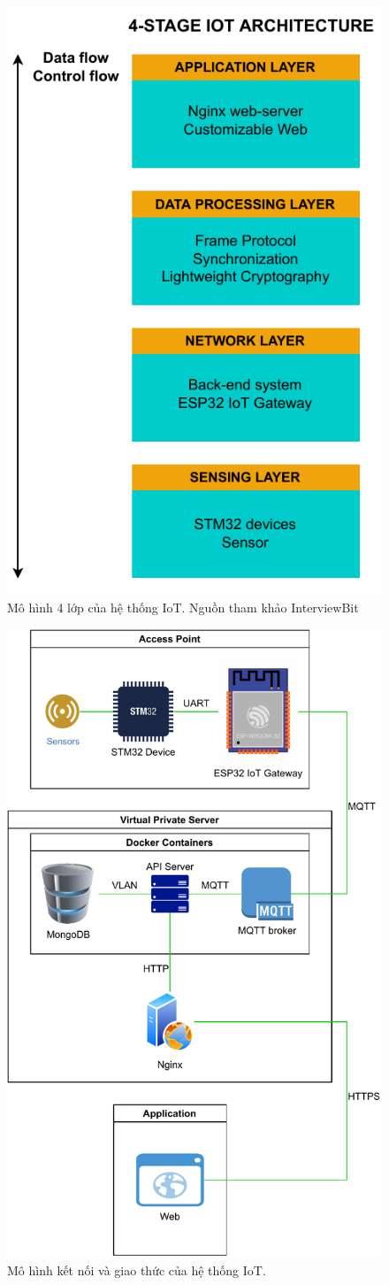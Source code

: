 \begin{figure}[htp]
\centering
\includegraphics[width=8 cm]{images/Thesis-Page-2-IoT-Archi.pdf}
\caption{Mô hình 4 lớp của hệ thống IoT. Nguồn tham khảo InterviewBit~\cite{IoT-4-Layer-Archi}}
\label{fig:IoT-4-Layer-Archi}
\end{figure}

\begin{figure}[htp]
\centering
\includegraphics[width=0.75\linewidth]{images/Thesis-Page-3-IoT-Connections-Model.pdf}
\caption{Mô hình kết nối và giao thức của hệ thống IoT.}
\label{fig:IoT-Connections-Model}
\end{figure}

